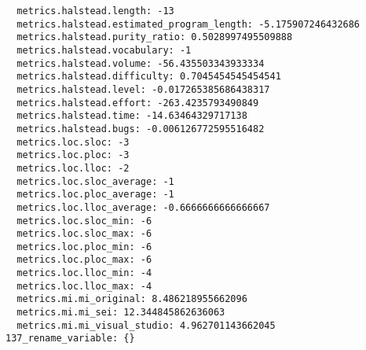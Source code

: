 \begin{verbatim}
  metrics.halstead.length: -13
  metrics.halstead.estimated_program_length: -5.175907246432686
  metrics.halstead.purity_ratio: 0.5028997495509888
  metrics.halstead.vocabulary: -1
  metrics.halstead.volume: -56.435503343933334
  metrics.halstead.difficulty: 0.7045454545454541
  metrics.halstead.level: -0.017265385686438317
  metrics.halstead.effort: -263.4235793490849
  metrics.halstead.time: -14.63464329717138
  metrics.halstead.bugs: -0.006126772595516482
  metrics.loc.sloc: -3
  metrics.loc.ploc: -3
  metrics.loc.lloc: -2
  metrics.loc.sloc_average: -1
  metrics.loc.ploc_average: -1
  metrics.loc.lloc_average: -0.6666666666666667
  metrics.loc.sloc_min: -6
  metrics.loc.sloc_max: -6
  metrics.loc.ploc_min: -6
  metrics.loc.ploc_max: -6
  metrics.loc.lloc_min: -4
  metrics.loc.lloc_max: -4
  metrics.mi.mi_original: 8.486218955662096
  metrics.mi.mi_sei: 12.344845862636063
  metrics.mi.mi_visual_studio: 4.962701143662045
137_rename_variable: {}

\end{verbatim}
